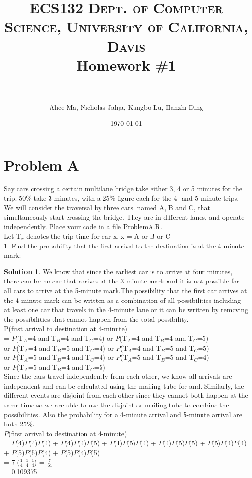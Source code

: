 \documentclass[paper=a4, fontsize=11pt]{scrartcl} %
\title{	
\normalfont \normalsize 
\textsc{ECS132 \hfill Dept. of Computer Science, University of California, Davis} %
\horrule{0.5pt} \\[0.4cm] %
\huge Homework \#1 \\ %
\horrule{2pt} \\[0.5cm] %
}
\author{Alice Ma, Nicholas Jahja, Kangbo Lu, Hanzhi Ding} %
\date{\today}
\numberwithin{equation}{section} %
\numberwithin{figure}{section} %
\numberwithin{table}{section} %
\theoremstyle{definition}
\newtheorem*{solution}{Solution}
\begin{document}
\maketitle

\section{Problem A}
Say cars crossing a certain multilane bridge take either 3, 4 or 5 minutes for the trip. 50\% take 3 minutes, with a 25\% figure each for the 4- and 5-minute trips. We will consider the traversal by three cars, named A, B and C, that simultaneously start crossing the bridge. They are in different lanes, and operate independently. Place your code in a file ProblemA.R.\\

Let T${_x}$ denotes the trip time for car x, x = A or B or C\\

1. Find the probability that the first arrival to the destination is at the 4-minute mark:
    \begin{solution}
     We know that since the earliest car is to arrive at four minutes, there can be no car that arrives at the 3-minute mark and it is not possible for all cars to arrive at the 5-minute mark.The possibility that the first car arrives at the 4-minute mark can be written as a combination of all possibilities including at least one car that travels in the 4-minute lane or it can be written by removing the possibilities that cannot happen from the total possibility.\\
    P(first arrival to destination at 4-minute)\\
    = $P$(T${_A}$=4 and T${_B}$=4 and T${_C}$=4) or $P$(T${_A}$=4 and T${_B}$=4 and T${_C}$=5)\\
    or $P$(T${_A}$=4 and T${_B}$=5 and T${_C}$=4) or $P$(T${_A}$=4 and T${_B}$=5 and T${_C}$=5)\\
    or $P$(T${_A}$=5 and T${_B}$=4 and T${_C}$=4) or $P$(T${_A}$=5 and T${_B}$=5 and T${_C}$=4)\\
    or $P$(T${_A}$=5 and T${_B}$=4 and T${_C}$=5)\\
    Since the cars travel independently from each other, we know all arrivals are independent and can be calculated using the mailing tube for and. Similarly, the different events are disjoint from each other since they cannot both happen at the same time so we are able to use the disjoint or mailing tube to combine the possibilities. Also the probability for a 4-minute arrival and 5-minute arrival are both 25\%.\\
    $P$(first arrival to destination at 4-minute)\\
    = $P$(4)$P$(4)$P$(4) + $P$(4)$P$(4)$P$(5) + $P$(4)$P$(5)$P$(4) + $P$(4)$P$(5)$P$(5) + $P$(5)$P$(4)$P$(4) + $P$(5)$P$(5)$P$(4) + $P$(5)$P$(4)$P$(5) \\
    = 7 (\( \displaystyle \frac{1}{4} \) \times \( \displaystyle \frac{1}{4} \) \times \( \displaystyle \frac{1}{4} \))
    = \( \displaystyle \frac{7}{64} \)\\
    = 0.109375\\
    \end{solution}
\end{document}
